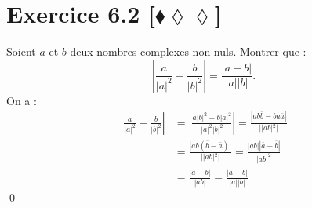 \documentclass[10pt]{article}
\begin{document}

\section*{Exercice 6.2 [$\blacklozenge\lozenge\lozenge$]}
\begin{tcolorbox}[enhanced, width=7in, center, size=fbox, fontupper=\large, drop shadow southwest]
    Soient $a$ et $b$ deux nombres complexes non nuls. Montrer que :
    \begin{equation*}
        \left|\frac{a}{|a|^2}-\frac{b}{|b|^2}\right|=\frac{|a-b|}{|a||b|}.
    \end{equation*}
    On a : 
    \begin{align*}
        \left|\frac{a}{|a|^2}-\frac{b}{|b|^2}\right| &= \left|\frac{a|b|^2-b|a|^2}{|a|^2|b|^2}\right| = \frac{|ab\overline{b}-ba\overline{a}|}{||ab|^2|}\\
        &=\frac{\left|ab(\overline{b}-\overline{a})\right|}{||ab|^2|} =\frac{|ab||\overline{a}-\overline{b}|}{|ab|^2}\\
        &=\frac{|a-b|}{|ab|} = \frac{|a-b|}{|a||b|}
    \end{align*}
    \qed
\end{tcolorbox}

\end{document}
